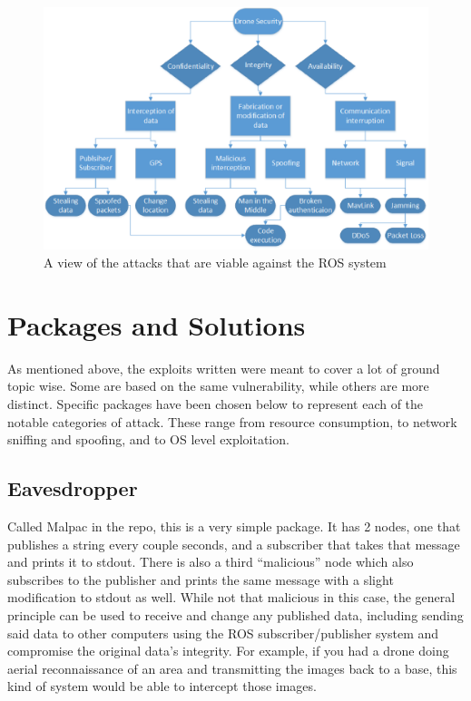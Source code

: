 \documentclass[IEEEtran,letterpaper,10pt,notitlepage,draftclsnofoot]{article}
\begin{document}
\begin{figure}[H]
    \centering
    \includegraphics[width=\textwidth]{model.eps}
    \caption{A view of the attacks that are viable against the ROS system}
\end{figure}

\section{Packages and Solutions}
As mentioned above, the exploits written were meant to cover a lot of ground topic wise.
Some are based on the same vulnerability, while others are more distinct.
Specific packages have been chosen below to represent each of the notable categories of attack.
These range from resource consumption, to network sniffing and spoofing, and to OS level exploitation.

\subsection{Eavesdropper}
Called Malpac in the repo, this is a very simple package. It has 2 nodes, one that publishes a string every couple seconds, and 
a subscriber that takes that message and prints it to stdout. There is also a third “malicious” node which also subscribes to 
the publisher and prints the same message with a slight modification to stdout as well. While not that malicious in this case, 
the general principle can be used to receive and change any published data, including sending said data to other computers 
using the ROS subscriber/publisher system and compromise the original data’s integrity.
For example, if you had a drone doing aerial reconnaissance of an area and transmitting the images back to a base, this kind of 
system would be able to intercept those images.
\end{document}
